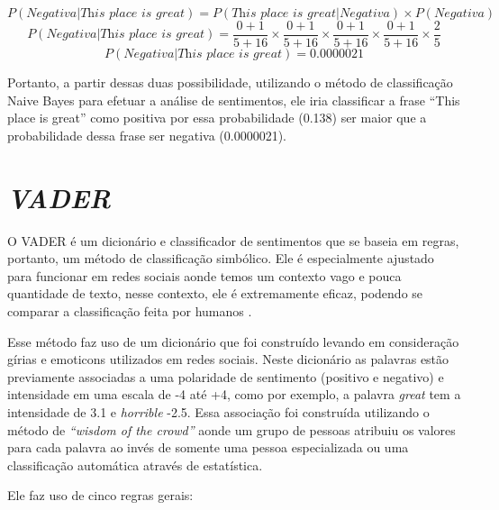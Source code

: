 \[ P(Negativa|\textit{This place is great})
=
P(\textit{This place is great}|Negativa) \times
P(Negativa)
\]
\[  P(Negativa|\textit{This place is great}) = \frac{0 + 1}{5 + 16} \times
\frac{0 + 1}{5 + 16} \times \frac{0 + 1}{5 + 16} \times
\frac{0 + 1}{5 + 16} \times \frac{2}{5}
\]
\[ P(Negativa|\textit{This place is great}) = 0.0000021
\]

Portanto, a partir dessas duas possibilidade, utilizando o método de
classificação Naive Bayes para efetuar a análise de sentimentos, ele iria
classificar a frase ``This place is great'' como positiva por essa probabilidade
(0.138) ser maior que a probabilidade dessa frase ser negativa (0.0000021).



\section{\textit{VADER}}

O \ac{VADER} é um dicionário e classificador de sentimentos que se baseia em
regras, portanto, um método de classificação simbólico. Ele é especialmente
ajustado para funcionar em redes sociais aonde temos um contexto vago e pouca
quantidade de texto, nesse contexto, ele é extremamente eficaz, podendo se
comparar a classificação feita por humanos \cite{conf/icwsm/HuttoG14}.

Esse método faz uso de um dicionário que foi construído levando em consideração
gírias e emoticons utilizados em redes sociais. Neste dicionário as palavras
estão previamente associadas a uma polaridade de sentimento (positivo e
negativo) e intensidade em uma escala de -4 até +4, como por exemplo, a palavra
\textit{great} tem a intensidade de 3.1 e \textit{horrible} -2.5. Essa
associação foi construída utilizando o método de \textit{``wisdom of the
crowd''} aonde um grupo de pessoas atribuiu os valores para cada palavra ao
invés de somente uma pessoa especializada ou uma classificação automática
através de estatística.

Ele faz uso de cinco regras gerais:


